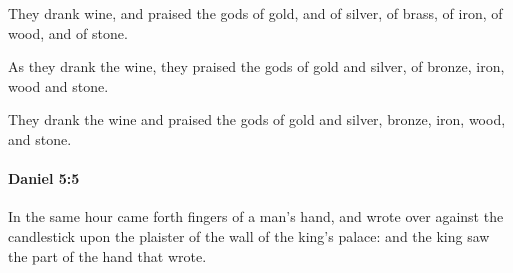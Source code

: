 			\begin{versebox}
					\item[BHS] 
					\item[LXX] 
					\item[ASV] They drank wine, and praised the gods of gold, and of silver, of brass, of iron, of wood, and of stone.
					\item[NIV] As they drank the wine, they praised the gods of gold and silver, of bronze, iron, wood and stone.
					\item[NRSV] They drank the wine and praised the gods of gold and silver, bronze, iron, wood, and stone.
			\end{versebox}

		\paragraph{Daniel 5:5} %
			\label{DANIEL-5-5}

			In the same hour came forth fingers of a man’s hand, and wrote over against the candlestick upon the plaister of the wall of the king’s palace: and the king saw the part of the hand that wrote.

